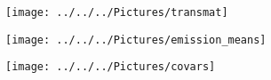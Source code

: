 \documentclass[english]{article}
\numberwithin{equation}{section}
\begin{document}
	
	
	\begin{figure}
		\centering
		\texttt{[image: ../../../Pictures/transmat]}
		\caption[State transition matrix]{}
		\label{fig:transmat}
	\end{figure}
	
		\begin{figure}
		\centering
		\texttt{[image: ../../../Pictures/emission\_means]}
		\caption[Emission matrix]{}
		\label{fig:emissionmeans}
	\end{figure}

	\begin{figure}
	\centering
	\texttt{[image: ../../../Pictures/covars]}
	\caption[Emission matrix covariances]{}
	\label{fig:emissioncovars}
	\end{figure}
	
\end{document}
